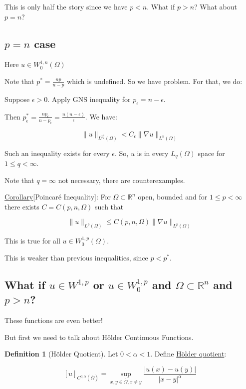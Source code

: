 \documentclass{article}
\theoremstyle{definition}
\newtheorem{definition}{Definition}
\begin{document}
This is only half the story since we have \(p < n\). What if \(p > n\)? What about \(p = n\)?

\subsection*{\(p=n\) case}

Here \(u \in W_0^{1,n}(\Omega)\) 

Note that \(p^{\ast} = \frac{np}{n - p}\) which is undefined. So we have problem. For that, we do:

Suppose \(\epsilon > 0\). Apply GNS inequality for \(p_{\epsilon} = n - \epsilon\).

Then \(p_{\epsilon}^{\ast} = \frac{n p_{\epsilon}}{n - p_{\epsilon} } = \frac{n(n-\epsilon)}{\epsilon} \). We have:

\[
    \lVert u \rVert _{L^{p^{\ast} _{\epsilon}}(\Omega)} < C_{\epsilon} \lVert \nabla u \rVert _{L^n(\Omega)} 
\]

Such an inequality exists for every \(\epsilon \). So, \(u\) is in every \(L_q(\Omega)\) space for \(1 \leq q < \infty\).

Note that \(q = \infty\) not necessary, there are counterexamples.

\underline{Corollary}[Poincar\'e Inequality]: For \(\Omega \subset \mathbb{R}^n\) open, bounded and for \(1 \leq p < \infty\) there exists \(C = C(p,n, \Omega)\) such that

\[
    \lVert u \rVert _{L^p(\Omega)} \leq C(p,n, \Omega) \lVert \nabla u \rVert _{L^p(\Omega)}
\]

This is true for all \(u \in W_0^{1,p}(\Omega)\).

This is weaker than previous inequalities, since \(p < p^{\ast}\).


\subsection*{What if \(u\in W^{1,p}\) or \(u\in W^{1,p}_0\) and \(\Omega \subset \mathbb{R}^n\) and \(p > n\)?}

These functions are even better!

But first we need to talk about H\"older Continuous Functions.

\begin{definition}
    [H\"older Quotient] Let \(0 < \alpha < 1\). Define \underline{H\"older quotient}:

    \[
        [u]_{C^{0,\alpha}(\overline{\Omega})} = \sup_{x,y\in \overline{\Omega}, x\neq y} \frac{\vert u(x) - u(y) \vert }{\vert x-y \vert ^ \alpha}
    \]
\end{definition}
\end{document}
